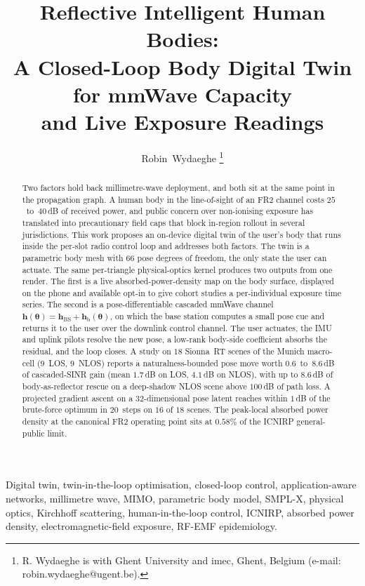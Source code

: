 \documentclass[journal,twocolumn,10pt]{IEEEtran}
\title{Reflective Intelligent Human Bodies:\\
A Closed-Loop Body Digital Twin for mmWave Capacity\\
and Live Exposure Readings}
\author{Robin~Wydaeghe%
  \thanks{R. Wydaeghe is with Ghent University and imec, Ghent, Belgium
  (e-mail: robin.wydaeghe@ugent.be).}}
\theoremstyle{plain}
\theoremstyle{definition}
\theoremstyle{remark}
\newcommand{\hh}{\bm{h}}
\newcommand{\thetab}{\bm{\theta}}
\newcommand{\hBS}{\bm{h}_{\mathrm{BS}}}
\newcommand{\hbody}{\bm{h}_{\mathrm{b}}}
\begin{document}
\maketitle

\begin{abstract}
Two factors hold back millimetre-wave deployment, and both sit at the
same point in the propagation graph. A human body in the line-of-sight
of an FR2 channel costs $25$~to~$40\,$dB of received power, and public
concern over non-ionising exposure has translated into precautionary
field caps that block in-region rollout in several jurisdictions. This
work proposes an on-device digital twin of the user's body that runs
inside the per-slot radio control loop and addresses both factors. The
twin is a parametric body mesh with $66$ pose degrees of freedom, the
only state the user can actuate. The same per-triangle physical-optics
kernel produces two outputs from one render. The first is a live
absorbed-power-density map on the body surface, displayed on the phone
and available opt-in to give cohort studies a per-individual exposure
time series. The second is a pose-differentiable cascaded mmWave
channel $\hh(\thetab) = \hBS + \hbody(\thetab)$, on which the base
station computes a small pose cue and returns it to the user over the
downlink control channel. The user actuates, the IMU and uplink pilots
resolve the new pose, a low-rank body-side coefficient absorbs the
residual, and the loop closes. A study on $18$ Sionna~RT scenes of the
Munich macro-cell ($9$~LOS, $9$~NLOS) reports a naturalness-bounded
pose move worth $0.6$~to~$8.6\,$dB of cascaded-SINR gain (mean
$1.7\,$dB on LOS, $4.1\,$dB on NLOS), with up to $8.6\,$dB of
body-as-reflector rescue on a deep-shadow NLOS scene above $100\,$dB
of path loss. A projected gradient ascent on a $32$-dimensional pose
latent reaches within $1\,$dB of the brute-force optimum in $20$~steps
on $16$ of $18$ scenes. The peak-local absorbed power density at the
canonical FR2 operating point sits at $0.58\%$ of the ICNIRP
general-public limit.
\end{abstract}

\begin{IEEEkeywords}
Digital twin, twin-in-the-loop optimisation, closed-loop control,
application-aware networks, millimetre wave, MIMO, parametric body
model, SMPL-X, physical optics, Kirchhoff scattering, human-in-the-loop
control, ICNIRP, absorbed power density, electromagnetic-field
exposure, RF-EMF epidemiology.
\end{IEEEkeywords}
\end{document}
